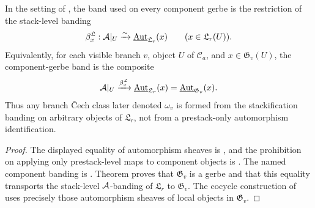 \begin{corollary}\label{cor:branch-obstruction-uses-stack-band}
In the setting of , the band used on every
component gerbe is the restriction of the stack-level banding
\[
\beta^{\mathfrak L}_x:\mathcal{A}|_U\xrightarrow{\sim}
\underline{\mathrm{Aut}}_{\mathfrak L_r}(x)
\qquad (x\in\mathfrak L_r(U)).
\]
Equivalently, for each visible branch $v$, object $U$ of $\mathcal C_a$, and
$x\in\mathfrak G_v(U)$, the component-gerbe band is the composite
\[
\mathcal{A}|_U\xrightarrow{\beta^{\mathfrak L}_x}
\underline{\mathrm{Aut}}_{\mathfrak L_r}(x)
=
\underline{\mathrm{Aut}}_{\mathfrak G_v}(x).
\]
Thus any branch \v{C}ech class later denoted $\omega_v$ is formed from the
stackification banding on arbitrary objects of $\mathfrak L_r$, not from a
prestack-only automorphism identification.
\end{corollary}

\begin{proof}
The displayed equality of automorphism sheaves is
, and the prohibition on applying only
prestack-level maps to component objects is
. The named component banding is
. Theorem
 proves that $\mathfrak G_v$ is a gerbe
and that this equality transports the stack-level $\mathcal{A}$-banding of
$\mathfrak L_r$ to $\mathfrak G_v$. The cocycle construction of
 uses precisely those
automorphism sheaves of local objects in $\mathfrak G_v$.
\end{proof}

